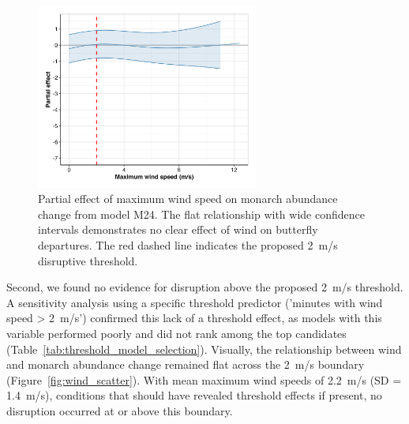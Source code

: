 \begin{figure}[htbp]
\centering
\includegraphics[width=0.65\textwidth]{figures/results/m24_wind_partial_effect.png}
\caption{Partial effect of maximum wind speed on monarch abundance change from model M24. The flat relationship with wide confidence intervals demonstrates no clear effect of wind on butterfly departures. The red dashed line indicates the proposed 2~m/s disruptive threshold.}
\label{fig:m24_wind_partial_effect}
\end{figure}

Second, we found no evidence for disruption above the proposed 2~m/s threshold. A sensitivity analysis using a specific threshold predictor ('minutes with wind speed > 2~m/s') confirmed this lack of a threshold effect, as models with this variable performed poorly and did not rank among the top candidates (Table~\ref{tab:threshold_model_selection}). Visually, the relationship between wind and monarch abundance change remained flat across the 2~m/s boundary (Figure~\ref{fig:wind_scatter}). With mean maximum wind speeds of 2.2~m/s (SD = 1.4~m/s), conditions that should have revealed threshold effects if present, no disruption occurred at or above this boundary.

